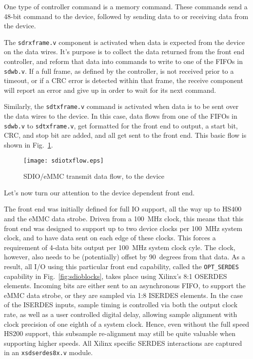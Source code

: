 \documentclass{gqtekspec}
\begin{document}
One type of controller command is a memory command.  These commands send a
48-bit command to the device, followed by sending data to or receiving data
from the device.

The {\tt sdrxframe.v} component is activated when data is expected from the
device on the data wires.  It's purpose is to collect the data returned from
the front end controller, and reform that data into commands to write to
one of the FIFOs in {\tt sdwb.v}.  If a full frame, as defined by the
controller, is not received prior to a timeout, or if a CRC error is detected
within that frame, the receive component will report an error and give up
in order to wait for its next command.

Similarly, the {\tt sdtxframe.v} command is activated when data is to be
sent over the data wires to the device.  In this case, data flows from one
of the FIFOs in {\tt sdwb.v} to {\tt sdtxframe.v}, get formatted for the
front end to output, a start bit, CRC, and stop bit are added, and all get
sent to the front end.  This basic flow is shown in Fig.~\ref{fig:sdiotxflow}.
\begin{figure}\begin{center}
\texttt{[image: sdiotxflow.eps]}
\caption{SDIO/eMMC transmit data flow, to the device}\label{fig:sdiotxflow}
\end{center}\end{figure}

Let's now turn our attention to the device dependent front end.

The front end was initially defined for full IO support, all the way up to
HS400 and the eMMC data strobe.  Driven from a 100~MHz clock, this means that
this front end was designed to support up to two device clocks per 100~MHz
system clock, and to have data sent on each edge of these clocks.  This
forces a requirement of 4-data bits output per 100~MHz system clock cyle.
The clock, however, also needs to be (potentially) offset by 90~degrees from
that data.  As a result, all I/O using this particular front end capability,
called the {\tt OPT\_SERDES} capability in Fig.~\ref{fig:sdioblocks}, takes
place using Xilinx's 8:1 OSERDES elements.  Incoming bits are either sent
to an asynchronous FIFO, to support the eMMC data strobe, or they are
sampled via 1:8 ISERDES elements.  In the case of the ISERDES inputs, sample
timing is controlled via both the output clock rate, as well as a user
controlled digital delay, allowing sample alignment with clock precision
of one eighth of a system clock.  Hence, even without the full speed HS200
support, this subsample re-alignment may still be quite valuable when supporting
higher speeds.  All Xilinx specific SERDES interactions are captured in an
{\tt xsdserdes8x.v} module.
\end{document}
